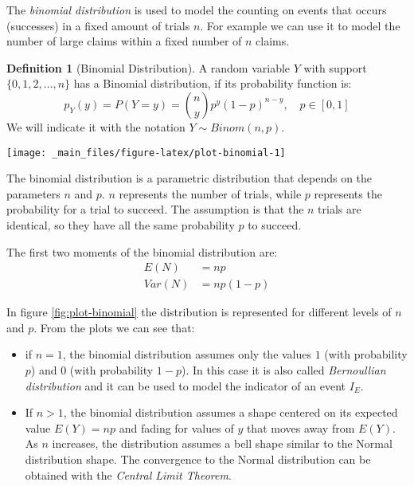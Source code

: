 \documentclass[a4paper, twoside, openright, 12pt]{report}
\let\origfigure\figure
\let\endorigfigure\endfigure
\renewenvironment{figure}[1][2] {
  \expandafter\origfigure\expandafter[!hbtp]
} {
  \endorigfigure
}
\providecommand{\tightlist}{%
  \setlength{\itemsep}{0pt}\setlength{\parskip}{0pt}}
\theoremstyle{definition}
\newtheorem{definition}{Definition}[chapter]
\theoremstyle{definition}
\theoremstyle{definition}
\theoremstyle{remark}
\begin{document}
The \emph{binomial distribution} is used to model the counting on events that occurs (successes) in a fixed amount of trials \(n\). For example we can use it to model the number of large claims within a fixed number of \(n\) claims.

\begin{definition}[Binomial Distribution]
\label{def:def-binomial} \iffalse (Binomial Distribution) \fi{} A random variable \(Y\) with support \(\{0,1,2, \dots, n \}\) has a Binomial distribution, if its probability function is:
\[
p_Y(y) = P\left( Y = y \right) = \binom{n}{y} p^y (1-p)^{n-y}, \quad p \in [0, 1]
\]
We will indicate it with the notation \(Y \sim Binom(n, p)\).
\end{definition}

\begin{figure}[!hbtp]

{\centering \texttt{[image: \_main\_files/figure-latex/plot-binomial-1]} 

}

\caption{Binomial distribution for some values of $n$ and $p$.}\label{fig:plot-binomial}
\end{figure}

The binomial distribution is a parametric distribution that depends on the parameters \(n\) and \(p\). \(n\) represents the number of trials, while \(p\) represents the probability for a trial to succeed. The assumption is that the \(n\) trials are identical, so they have all the same probability \(p\) to succeed.

The first two moments of the binomial distribution are:
\begin{align*}
E(N)   & = np \\
Var(N) & = np(1-p)
\end{align*}

In figure \ref{fig:plot-binomial} the distribution is represented for different levels of \(n\) and \(p\). From the plots we can see that:

\begin{itemize}
\tightlist
\item
  if \(n = 1\), the binomial distribution assumes only the values \(1\) (with probability \(p\)) and \(0\) (with probability \(1-p\)). In this case it is also called \emph{Bernoullian distribution} and it can be used to model the indicator of an event \(I_E\).
\item
  If \(n>1\), the binomial distribution assumes a shape centered on its expected value \(E(Y)=np\) and fading for values of \(y\) that moves away from \(E(Y)\). As \(n\) increases, the distribution assumes a bell shape similar to the Normal distribution shape. The convergence to the Normal distribution can be obtained with the \emph{Central Limit Theorem}.
\end{itemize}
\end{document}
